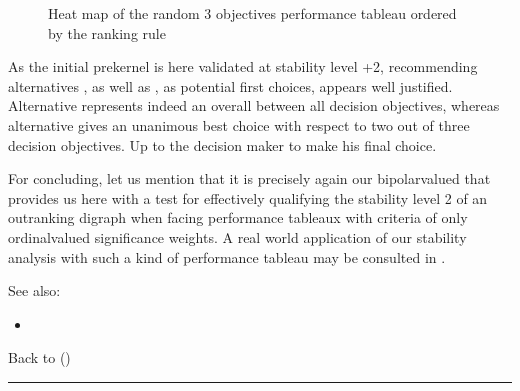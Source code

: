 \documentclass[a4paper,12pt,english]{sphinxhowto}
\let\sphinxpxdimen\pdfpxdimen\else\newdimen\sphinxpxdimen
\begin{document}
\begin{figure}[H]
\centering
\capstart

\noindent\sphinxincludegraphics[width=600\sphinxpxdimen]{{robustHeatmap}.png}
\caption{Heat map of the random 3 objectives performance tableau ordered by the  ranking rule}\label{\detokenize{pearls:robustheatmap}}\end{figure}

\sphinxAtStartPar
As the initial prekernel is here validated at stability level +2, recommending alternatives , as well as , as potential first choices, appears well justified. Alternative  represents indeed an overall  between all decision objectives, whereas alternative  gives an unanimous best choice with respect to two out of three decision objectives. Up to the decision maker to make his final choice.

\sphinxAtStartPar
For concluding, let us mention that it is precisely again our bipolar\sphinxhyphen{}valued  that provides us here with a  test for effectively qualifying the stability level 2  of an outranking digraph when facing performance tableaux with criteria of only ordinal\sphinxhyphen{}valued significance weights. A real world application of our stability analysis with such a kind of performance tableau may be consulted in .


\begin{sphinxseealso}{See also:}
\begin{itemize}
\item {} 
\sphinxAtStartPar
{}

\end{itemize}


\end{sphinxseealso}


\sphinxAtStartPar
Back to {\hyperref[\detokenize{pearls:pearls-label}]{}} ()


\bigskip\hrule\bigskip
\end{document}
